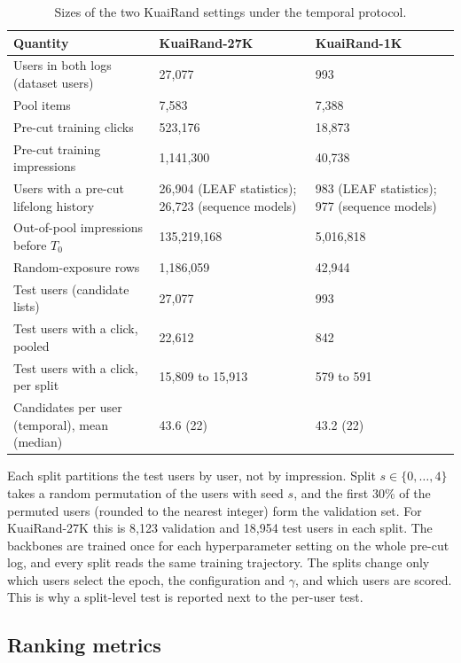 \documentclass[preprint,12pt,authoryear]{elsarticle}
\begin{document}
\begin{table}[tbp]
\centering
\caption{Sizes of the two KuaiRand settings under the temporal protocol.}
\label{tab:data}
\footnotesize
\begin{tabular}{p{}p{}p{}}
\toprule
Quantity & KuaiRand-27K & KuaiRand-1K \\
\midrule
Users in both logs (dataset users) & 27,077 & 993 \\
Pool items & 7,583 & 7,388 \\
Pre-cut training clicks & 523,176 & 18,873 \\
Pre-cut training impressions & 1,141,300 & 40,738 \\
Users with a pre-cut lifelong history & 26,904 (LEAF statistics); 26,723 (sequence models) & 983 (LEAF statistics); 977 (sequence models) \\
Out-of-pool impressions before $T_0$ & 135,219,168 & 5,016,818 \\
Random-exposure rows & 1,186,059 & 42,944 \\
Test users (candidate lists) & 27,077 & 993 \\
Test users with a click, pooled & 22,612 & 842 \\
Test users with a click, per split & 15,809 to 15,913 & 579 to 591 \\
Candidates per user (temporal), mean (median) & 43.6 (22) & 43.2 (22) \\
\bottomrule
\end{tabular}
\end{table}

Each split partitions the test users by user, not by impression. Split $s\in\{0,\dots,4\}$ takes a random permutation of the users with seed
$s$, and the first 30\% of the permuted users (rounded to the nearest integer) form the validation set. For KuaiRand-27K this is 8,123
validation and 18,954 test users in each split. The backbones are trained once for each hyperparameter setting on the whole pre-cut log, and
every split reads the same training trajectory. The splits change only which users select the epoch, the configuration and $\gamma$, and which
users are scored. This is why a split-level test is reported next to the per-user test.

\subsection{Ranking metrics}
\label{sec:protocol-metrics}
\end{document}
